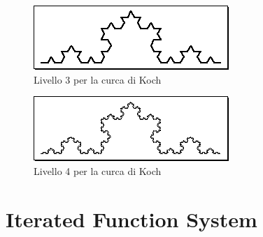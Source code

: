 \documentclass[11pt,a4paper]{scrreprt}
\begin{document}
\begin{figure}[!ht]
\centering
\includegraphics[scale=0.55]{images/koch3.png}
\caption{Livello 3 per la curca di Koch}
\label{fig:k3}
\end{figure}

\begin{figure}[!ht]
\centering
\includegraphics[scale=0.55]{images/koch4.png}
\caption{Livello 4 per la curca di Koch}
\label{fig:k4}
\end{figure}



\section{Iterated Function System}
\end{document}
